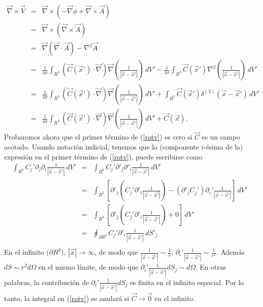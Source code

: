 \begin{eqnarray}
\vec\nabla\times\vec
V&=&\vec\nabla\times\left(-\vec\nabla\phi+\vec\nabla\times\vec
A\right) \\
&=& \vec\nabla\times(\vec\nabla\times\vec A) \\
&=& \vec\nabla(\vec\nabla\cdot\vec A) -\nabla^2\vec A\\
&=& \frac{1}{4\pi}\int_{R^3}(\vec
C(\vec x')\cdot\vec\nabla)\vec\nabla\left(\frac{1}{\left|\vec
x-\vec x'\right|}\right)\,dV' -\frac{1}{4\pi}\int_{R^3}\vec
C(\vec x')\nabla^2\left(\frac{1}{\left|\vec
x-\vec x'\right|}\right)\,dV' \\
&=& \frac{1}{4\pi}\int_{R^3}(\vec
C(\vec x')\cdot\vec\nabla)\vec\nabla\left(\frac{1}{\left|\vec
x-\vec x'\right|}\right)\,dV' +\int_{R^3}\vec
C(\vec x')\delta^{(3)}\left(\vec x-\vec x'\right)\,dV' \\
&=& \frac{1}{4\pi}\int_{R^3}(\vec
C(\vec x')\cdot\vec\nabla)\vec\nabla\left(\frac{1}{\left|\vec
x-\vec x'\right|}\right)\,dV' +\vec C(\vec x). \label{rotv}
\end{eqnarray}
Probaremos ahora que el primer término de (\ref{rotv}) es cero si $\vec C$ es
un campo acotado. Usando notación indicial, tenemos que la (componente
$i$-ésima de la) expresión en el primer término de (\ref{rotv}), puede
escribirse como
\begin{eqnarray}
\int_{R^3}C_j'\partial_j\partial_i\frac{1}{\left|\vec
x-\vec x'\right|}\,dV'
&=&\int_{R^3}C_j'\partial'_j\partial'_i\frac{1}{
\left|\vec x-\vec x'\right|}\,dV'\\
&=&\int_{R^3}\left[\partial'_j\left(C_j'\partial'_i\frac{1}{
\left|\vec x-\vec x'\right|}\right)-(\partial'_jC_j')\partial_i'\frac{1}{
\left|\vec x-\vec x'\right|}\right]\,dV'\\
&=&\int_{R^3}\left[\partial'_j\left(C_j'\partial'_i\frac{1}{
\left|\vec x-\vec x'\right|}\right)+0\right]\,dV'\\
&=&\oint_{\partial R^3}C_j'\partial'_i\frac{1}{\left|\vec x-\vec
x'\right|}\,dS'_j\\
\end{eqnarray}
En el infinito ($\partial R^3$), $|\vec x|\rightarrow \infty$, de modo que
$\frac{1}{\left|\vec x-\vec x'\right|}\sim \frac{1}{r}$,
$\partial_i'\frac{1}{\left|\vec x-\vec x'\right|}\sim \frac{1}{r^2}$. Además
$dS\sim r^2d\Omega$ en el mismo límite, de modo que
$\partial_i'\frac{1}{\left|\vec x-\vec x'\right|}dS_j\sim d\Omega$. En otras
palabras, la contribución de $\partial_i'\frac{1}{\left|\vec x-\vec
x'\right|}dS_j$ es finita en el infinito espacial. Por lo tanto, la integral
en (\ref{rotv}) se anulará si $\vec C\rightarrow\vec 0$ en el infinito.

